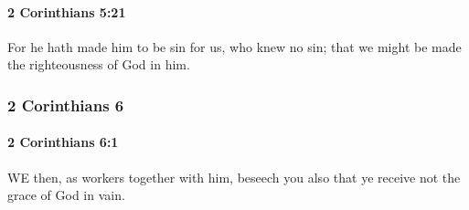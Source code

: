 		\paragraph{2 Corinthians 5:21} %
			\label{2CORINTHIANS-5-21}

			For he hath made him to be sin for us, who knew no sin; that we might be made the righteousness of God in him.

			\begin{framed}
			\scriptsize
				\begin{compactdesc}
					\item[SBLG] 
				\end{compactdesc}
			\end{framed}

	\subsubsection{2 Corinthians 6} %
		\label{2CORINTHIANS-6}
		
		\paragraph{2 Corinthians 6:1} %
			\label{2CORINTHIANS-6-1}

			WE then, as workers together with him, beseech you also that ye receive not the grace of God in vain.

